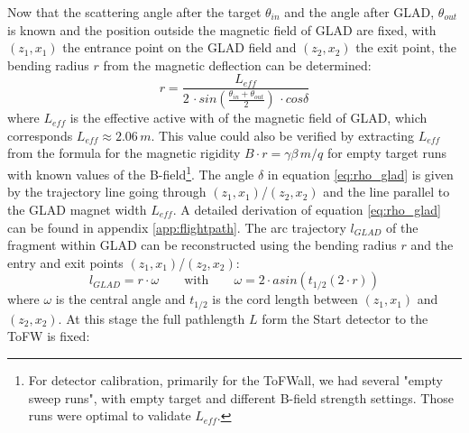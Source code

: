 Now that the scattering angle after the target $\theta_{in}$ and the angle after GLAD, $\theta_{out}$ is known and the position outside the magnetic field of GLAD are fixed, with $(z_1,x_1)$  the entrance point on the GLAD field and $(z_2,x_2)$ the exit point, the bending radius $r$ from the magnetic deflection can be determined:
\begin{equation}\label{eq:rho_glad}
r = \frac{L_{eff}}{2\,\cdot sin\left(\frac{\theta_{in}+\theta_{out}}{2}\right)\,\cdot cos\delta}
\end{equation}
where $L_{eff}$ is the effective active with of the magnetic field of GLAD, which corresponds $L_{eff} \approx 2.06\,m$. This value could also be verified by extracting $L_{eff}$ from the formula for the magnetic rigidity $ B\cdot r = \gamma\beta \, m /q$ for empty target runs with known values of the B-field\footnote{For detector calibration, primarily for the ToFWall, we had several "empty sweep runs", with empty target and different B-field strength settings. Those runs were optimal to validate $L_{eff}$.}.\newline
The angle $\delta$ in equation \ref{eq:rho_glad} is given by the trajectory line going through $(z_1,x_1)$/$(z_2,x_2)$ and the line parallel to the GLAD magnet width $L_{eff}$.\newline
A detailed derivation of equation \ref{eq:rho_glad} can be found in appendix \ref{app:flightpath}.
The arc trajectory $l_{GLAD}$ of the fragment within GLAD can be reconstructed using the bending radius $r$ and the entry and exit points $(z_1,x_1)$/$(z_2,x_2)$:
\begin{equation}\label{eq:arc}
l_{GLAD} = r \cdot \omega\qquad \text{with}\qquad \omega = 2\cdot asin(t_{1/2}{(2\cdot r)})
\end{equation}
where $\omega$ is the central angle and  $t_{1/2}$ is the cord length between $(z_1,x_1)$ and $(z_2,x_2)$.\newline
At this stage the full pathlength $L$ form the Start detector to the ToFW is fixed:
